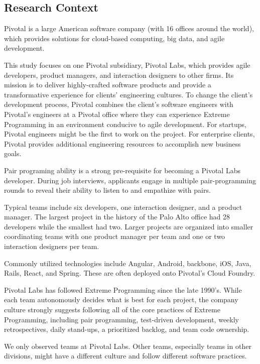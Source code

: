 \subsection{Research Context}
\label{ResearchContext}

Pivotal is a large American software company (with 16 offices around the world), which provides solutions for cloud-based computing, big data, and agile development. 

This study focuses on one Pivotal subsidiary, Pivotal Labs, which provides agile developers, product managers, and interaction designers to other firms. Its mission is to deliver highly-crafted software products and provide a transformative experience for clients’ engineering cultures. To change the client’s development process, Pivotal combines the client's software engineers with Pivotal's engineers at a Pivotal office where they can experience Extreme Programming in an environment conducive to agile development. For startups, Pivotal engineers might be the first to work on the project. For enterprise clients, Pivotal provides additional engineering resources to accomplish new business goals. 

Pair programing ability is a strong pre-requisite for becoming a Pivotal Labs developer. During job interviews, applicants engage in multiple pair-programming rounds to reveal their ability to listen to and empathize with pairs. 

Typical teams include six developers, one interaction designer, and a product manager. The largest project in the history of the Palo Alto office had 28 developers while the smallest had two. Larger projects are organized into smaller coordinating teams with one product manager per team and one or two interaction designers per team. 

Commonly utilized technologies include Angular, Android, backbone, iOS, Java, Rails, React, and Spring. These are often deployed onto Pivotal’s Cloud Foundry. 

Pivotal Labs has followed Extreme Programming \cite{BeckExtremeProgramming2004} since the late 1990's. While each team autonomously decides what is best for each project, the company culture strongly suggests following all of the core practices of Extreme Programming, including pair programming, test-driven development, weekly retrospectives, daily stand-ups, a prioritized backlog, and team code ownership.

We only observed teams at Pivotal Labs. Other teams, especially teams in other divisions, might have a different culture and follow different software practices.
